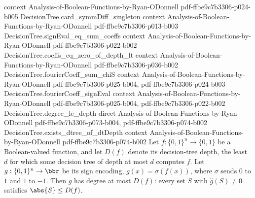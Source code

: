 \begin{theorem}
  {context}
  {Analysis-of-Boolean-Functions-by-Ryan-ODonnell}
  {pdf-ffbe9c7b3306-p024-b005}
\proofstep
  {DecisionTree.card_symmDiff_singleton}
  {context}
  {Analysis-of-Boolean-Functions-by-Ryan-ODonnell}
  {pdf-ffbe9c7b3306-p013-b003}
\proofstep
  {DecisionTree.signEval_eq_sum_coeffs}
  {context}
  {Analysis-of-Boolean-Functions-by-Ryan-ODonnell}
  {pdf-ffbe9c7b3306-p022-b002}
\proofstep
  {DecisionTree.coeffs_eq_zero_of_depth_lt}
  {context}
  {Analysis-of-Boolean-Functions-by-Ryan-ODonnell}
  {pdf-ffbe9c7b3306-p036-b002}
\proofstep
  {DecisionTree.fourierCoeff_sum_chiS}
  {context}
  {Analysis-of-Boolean-Functions-by-Ryan-ODonnell}
  {pdf-ffbe9c7b3306-p025-b004,
    pdf-ffbe9c7b3306-p024-b003}
\proofstep
  {DecisionTree.fourierCoeff_signEval}
  {context}
  {Analysis-of-Boolean-Functions-by-Ryan-ODonnell}
  {pdf-ffbe9c7b3306-p025-b004,
    pdf-ffbe9c7b3306-p022-b002}
\proofstep
  {DecisionTree.degree_le_depth}
  {direct}
  {Analysis-of-Boolean-Functions-by-Ryan-ODonnell}
  {pdf-ffbe9c7b3306-p073-b004,
    pdf-ffbe9c7b3306-p074-b002}
\proofstep
  {DecisionTree.exists_dtree_of_dtDepth}
  {context}
  {Analysis-of-Boolean-Functions-by-Ryan-ODonnell}
  {pdf-ffbe9c7b3306-p074-b002}
Let $f : \{0,1\}^n \to \{0,1\}$ be a Boolean-valued function, and let $D(f)$ denote its
decision-tree depth, the least $d$ for which some decision tree of depth at most $d$
computes $f$. Let $g : \{0,1\}^n \to \bbr$ be its sign encoding, $g(x) = \sigma(f(x))$,
where $\sigma$ sends $0$ to $1$ and $1$ to $-1$. Then $g$ has degree at most $D(f)$:
every set $S$ with $\hat g(S) \neq 0$ satisfies $\abs{S} \le D(f)$.
\end{theorem}
